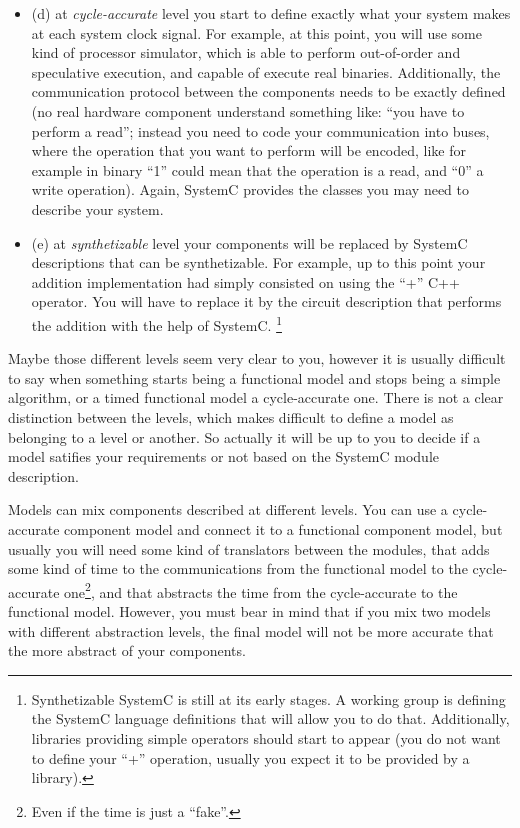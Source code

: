 {\begin{itemize}
		Again, SystemC provides you classes to handle time in your system.
	\item (d) at \emph{cycle-accurate} level you start to define exactly what your system makes at each system clock signal.
		For example, at this point, you will use some kind of processor simulator, which is able to perform out-of-order and speculative execution, and capable of execute real binaries.
		Additionally, the communication protocol between the components needs to be exactly defined (no real hardware component understand something like: ``you have to perform a read''; instead you need to code your communication into buses, where the operation that you want to perform will be encoded, like for example in binary ``1'' could mean that the operation is a read, and ``0'' a write operation).
		Again, SystemC provides the classes you may need to describe your system.
	\item (e) at \emph{synthetizable} level your components will be replaced by SystemC descriptions that can be synthetizable.
		For example, up to this point your addition implementation had simply consisted on using the ``+'' C++ operator.
		You will have to replace it by the circuit description that performs the addition with the help of SystemC.
		\footnote{Synthetizable SystemC is still at its early stages. A working group is defining the SystemC language definitions that will allow you to do that. Additionally, libraries providing simple operators should start to appear (you do not want to define your ``+'' operation, usually you expect it to be provided by a library).}
\end{itemize}

Maybe those different levels seem very clear to you, however it is usually difficult to say when something starts being a functional model and stops being a simple algorithm, or a timed functional model a cycle-accurate one.
There is not a clear distinction between the levels, which makes difficult to define a model as belonging to a level or another.
So actually it will be up to you to decide if a model satifies your requirements or not based on the SystemC module description.

Models can mix components described at different levels. 
You can use a cycle-accurate component model and connect it to a functional component model, but usually you will need some kind of translators between the modules, that adds some kind of time to the communications from the functional model to the cycle-accurate one\footnote{Even if the time is just a ``fake''.}, and that abstracts the time from the cycle-accurate to the functional model.
However, you must bear in mind that if you mix two models with different abstraction levels, the final model will not be more accurate that the more abstract of your components.

}

